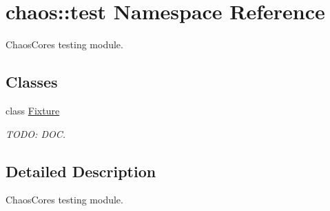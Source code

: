 \hypertarget{namespacechaos_1_1test}{}\section{chaos\+:\+:test Namespace Reference}
\label{namespacechaos_1_1test}


Chaos\+Core\textquotesingle{}s testing module.  


\subsection*{Classes}
\begin{DoxyCompactItemize}
\item 
class \hyperlink{classchaos_1_1test_1_1_fixture}{Fixture}
\begin{DoxyCompactList}\small\item\em T\+O\+D\+O\+: D\+O\+C. \end{DoxyCompactList}\end{DoxyCompactItemize}


\subsection{Detailed Description}
Chaos\+Core\textquotesingle{}s testing module. 